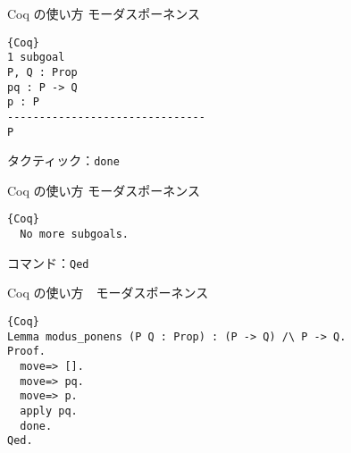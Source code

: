 \documentclass[dvipdfmx,cjk]{beamer}
\theoremstyle{mystyle}
\newcommand{\0}{\textbf{0}}
\begin{document}
\begin{frame}[fragile]{Coq の使い方 モーダスポーネンス}
	\begin{screen}
	  \begin{lstlisting}{Coq}
1 subgoal
P, Q : Prop
pq : P -> Q
p : P
-------------------------------
P \end{lstlisting}
	\end{screen} \pause
	タクティック：{\tt done}
\end{frame}

\begin{frame}[fragile]{Coq の使い方 モーダスポーネンス}
	\begin{screen}
	  \begin{lstlisting}{Coq}
  No more subgoals. \end{lstlisting}
	\end{screen} \pause
	コマンド：{\tt Qed}
\end{frame}

\begin{frame}[fragile]{Coq の使い方　モーダスポーネンス}
	\begin{lstlisting}{Coq}
Lemma modus_ponens (P Q : Prop) : (P -> Q) /\ P -> Q.
Proof.
  move=> [].
  move=> pq.
  move=> p.
  apply pq.
  done.
Qed. \end{lstlisting}
\end{frame}
\end{document}
